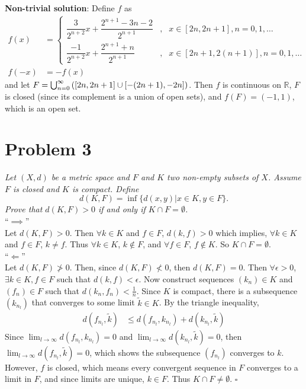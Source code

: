 \documentclass[12pt]{article}
\begin{document}
\noindent\textbf{Non-trivial solution}: Define $f$ as
\begin{align*}
    f(x) &= \left\{\begin{array}{lcl}
        \dfrac{3}{2^{n+2}}x + \dfrac{2^{n+1} - 3n - 2}{2^{n+1}} &,& x \in [2n, 2n+1], n = 0, 1, \dots \\[.3cm]
        \dfrac{-1}{2^{n+2}}x + \dfrac{2^{n+1} + n}{2^{n+1}} &,& x \in [2n+1, 2(n+1)], n = 0, 1, \dots
    \end{array}\right. \\
    f(-x) &= -f(x)
\end{align*}
and let $F = \bigcup_{n=0}^{\infty}\qty([2n,2n+1]\cup[-(2n+1),-2n])$.  Then $f$ is continuous on $\mathbb{R}$, $F$ is closed (since its complement is a union of open sets), and $f(F) = (-1, 1)$, which is an open set.

\section*{Problem 3}
{\it Let $(X,d)$ be a metric space and $F$ and $K$ two non-empty subsets of $X$.  Assume $F$ is closed and $K$ is compact.  Define}
\begin{equation}
	\label{problem_3_definition}
	d(K, F) = \inf\{d(x, y) | x \in K, y \in F\}.
\end{equation}
{\it Prove that $d(K, F) > 0$ if and only if $K \cap F = \emptyset$.} \\

\noindent ``$\implies$'' \\

Let $d(K, F) > 0$.  Then $\forall k\in K$ and $f\in F$, $d(k, f) > 0$ which implies, $\forall k\in K$ and $f\in F$, $k \neq f$.  Thus $\forall k \in K$, $k\notin F$, and $\forall f \in F$, $f \notin K$.  So $K \cap F = \emptyset$. \\

\noindent ``$\Longleftarrow$'' \\

Let $d(K, F) \not> 0$.  Then, since $d(K,F) \not< 0$, then $d(K,F) = 0$.  Then $\forall \epsilon > 0$, $\exists k \in K, f \in F$ such that $d(k, f) < \epsilon$.  Now construct sequences $(k_n) \in K$ and $(f_n) \in F$ such that $d(k_n, f_n) < \frac{1}{n}$.  Since $K$ is compact, there is a subsequence $(k_{n_l})$ that converges to some limit $\tilde{k} \in K$.  By the triangle inequality,
\begin{align*}
    d(f_{n_l}, \tilde{k}) &\leq d(f_{n_l}, k_{n_l}) + d(k_{n_l}, \tilde{k})
\end{align*}
Since $\lim_{l\rightarrow\infty} d(f_{n_l}, k_{n_l}) = 0$ and $\lim_{l\rightarrow\infty} d(k_{n_l}, \tilde{k}) = 0$, then $\lim_{l\rightarrow\infty} d(f_{n_l}, \tilde{k}) = 0$, which shows the subsequence $(f_{n_l})$ converges to $k$.  However, $f$ is closed, which means every convergent sequence in $F$ converges to a limit in $F$, and since limits are unique, $k \in F$.  Thus $K \cap F \neq \emptyset$. \hfill $\square$
\end{document}
